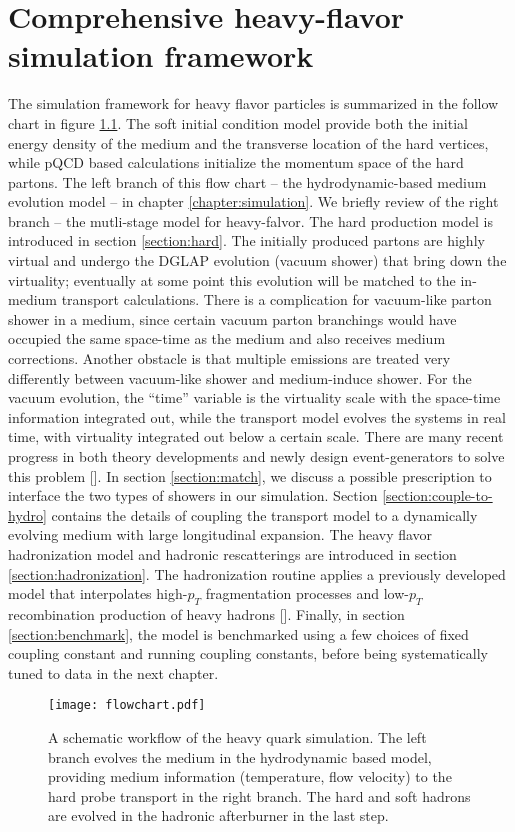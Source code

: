 \chapter{Comprehensive heavy-flavor simulation framework}
\label{chapter:coupling}
The simulation framework for heavy flavor particles is summarized in the follow chart in figure \ref{fig:flowchart}.
The soft initial condition model provide both the initial energy density of the medium and the transverse location of the hard vertices, while pQCD based calculations initialize the momentum space of the hard partons.
The left branch of this flow chart -- the hydrodynamic-based medium evolution model -- in chapter \ref{chapter:simulation}.
We briefly review of the right branch -- the mutli-stage model for heavy-falvor.
The hard production model is introduced in section \ref{section:hard}.
The initially produced partons are highly virtual and undergo the DGLAP evolution (vacuum shower) that bring down the virtuality; eventually at some point this evolution will be matched to the in-medium transport calculations.
There is a complication for vacuum-like parton shower in a medium, since  certain vacuum parton branchings would have occupied the same space-time as the medium and also receives medium corrections.
Another obstacle is that multiple emissions are treated very differently between vacuum-like shower and medium-induce shower.
For the vacuum evolution, the ``time'' variable is the virtuality scale with the space-time information integrated out, while the transport model evolves the systems in real time, with virtuality integrated out below a certain scale.
There are many recent progress in both theory developments and newly design event-generators to solve this problem [].
In section \ref{section:match}, we discuss a possible prescription to interface the two types of showers in our simulation.
Section \ref{section:couple-to-hydro} contains the details of coupling the transport model to a dynamically evolving medium with large longitudinal expansion.
The heavy flavor hadronization model and hadronic rescatterings are introduced in section \ref{section:hadronization}.
The hadronization routine applies a previously developed model that interpolates high-$p_T$ fragmentation processes and low-$p_T$ recombination production of heavy hadrons [].
Finally, in section \ref{section:benchmark}, the model is benchmarked using a few choices of fixed coupling constant and running coupling constants, before being systematically tuned to data in the next chapter.
\begin{figure}
\centering
\texttt{[image: flowchart.pdf]}
\caption{A schematic workflow of the heavy quark simulation. The left branch evolves the medium in the hydrodynamic based model, providing medium information (temperature, flow velocity) to the hard probe transport in the right branch. The hard and soft hadrons are evolved in the hadronic afterburner in the last step.}
\label{fig:flowchart}
\end{figure}

